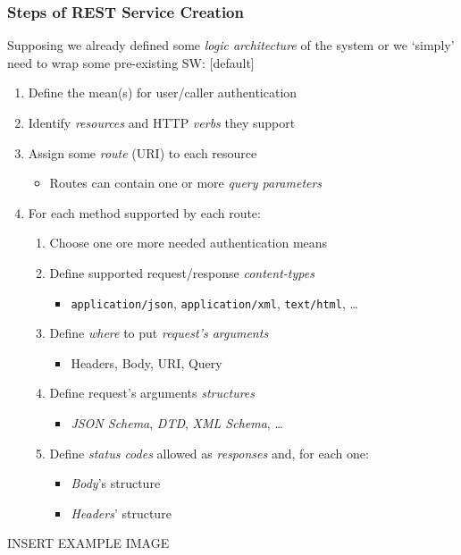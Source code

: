 \begin{frame}[allowframebreaks]
	\frametitle{Steps of REST Service Creation}
	
	Supposing we already defined some \emph{logic architecture} of the system or we `simply' need to wrap some pre-existing SW:
	[default]
	\begin{enumerate}
		\item Define the mean(s) for user/caller authentication
		\item Identify \emph{resources} and HTTP \emph{verbs} they support
		\item Assign some \emph{route} (URI) to each resource
		\begin{itemize}
			\item Routes can contain one or more \emph{query parameters}
		\end{itemize}
		
		\framebreak
		
		\item For each method supported by each route:
		\begin{enumerate}
			\item Choose one ore more needed authentication means
			\item Define supported request/response \emph{content-types}
			\begin{itemize}
				\item \texttt{application/json}, \texttt{application/xml}, \texttt{text/html}, \ldots			
			\end{itemize}
			\item Define \emph{where} to put \emph{request's arguments}
			\begin{itemize}
				\item Headers, Body, URI, Query	
			\end{itemize}
			\item Define request's arguments \emph{structures}
			\begin{itemize}
				\item \emph{JSON Schema}, \emph{DTD}, \emph{XML Schema}, \ldots
			\end{itemize}
			\item Define \emph{status codes} allowed as \emph{responses} and, for each one:
				\begin{itemize}
					\item \emph{Body}'s structure
					\item \emph{Headers}' structure
				\end{itemize}
		\end{enumerate}
	\end{enumerate}
	
	\framebreak
	
	\begin{exampleblock}{INSERT EXAMPLE IMAGE}
		
	\end{exampleblock}
	
\end{frame}

